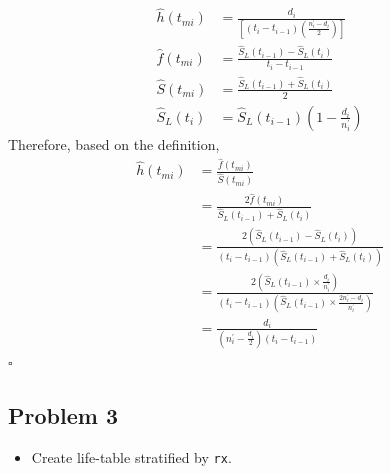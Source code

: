 \documentclass[
]{article}
\providecommand{\tightlist}{%
  \setlength{\itemsep}{0pt}\setlength{\parskip}{0pt}}
\begin{document}
\[
\begin{aligned}
\hat h(t_{mi}) & = \frac{d_i}{[(t_i -t_{i-1})(\frac{n_i^{\prime} - d_i}{2})]}\\
\hat f(t_{mi}) & = \frac{\hat S_L(t_{i-1})- \hat S_L(t_{i})}{t_i - t_{i-1}}\\
\hat S(t_{mi}) & = \frac{\hat S_L(t_{i-1}) + \hat S_L(t_{i})}{2}\\
\hat S_L(t_i) & = \hat S_L(t_{i-1})(1- \frac{d_i}{n_i^{\prime}})
\end{aligned}
\] Therefore, based on the definition, \[
\begin{aligned}
\hat h(t_{mi}) & = \frac{\hat f(t_{mi})}{\hat S(t_{mi})}\\
& = \frac{2\hat f(t_{mi})}{\hat S_L(t_{i-1}) + \hat S_L(t_{i})}\\
& = \frac{2(\hat S_L(t_{i-1}) - \hat S_L(t_{i}))}{(t_i - t_{i-1})(\hat S_L(t_{i-1}) + \hat S_L(t_{i}))}\\
& = \frac{2(\hat S_L(t_{i-1})\times\frac{d_i}{n_i^{\prime}})}{(t_i - t_{i-1})(\hat S_L(t_{i-1})\times\frac{2n_i^{\prime}-d_i}{n_i^{\prime}})}\\
& = \frac{d_i}{(n_i^{\prime}-\frac{d_i}{2})(t_i - t_{i-1})}
\end{aligned}
\] \hfill \(\square\)

\newpage

\hypertarget{problem-3}{%
\subsection{Problem 3}\label{problem-3}}

\begin{itemize}
\tightlist
\item
  Create life-table stratified by \texttt{rx}.
\end{itemize}
\end{document}
